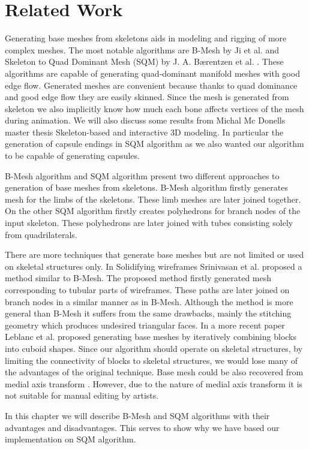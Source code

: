 \chapter{Related Work}
Generating base meshes from skeletons aids in modeling and rigging of more complex meshes. The most notable algorithms are B-Mesh by Ji et al. \cite{ji_bm} and Skeleton to Quad Dominant Mesh (SQM) by J. A. Bærentzen et al. \cite{sqm}. These algorithms are capable of generating quad-dominant manifold meshes with good edge flow. Generated meshes are convenient because thanks to quad dominance and good edge flow they are easily skinned. Since the mesh is generated from skeleton we also implicitly know how much each bone affects vertices of the mesh during animation. We will also discuss some results from Michal Mc Donells master thesis Skeleton-based and interactive 3D modeling\cite{sqm_phd}. In particular the generation of capsule endings in SQM algorithm as we also wanted our algorithm to be capable of generating capsules.

B-Mesh algorithm and SQM algorithm present two different approaches to generation of base meshes from skeletons. B-Mesh algorithm firstly generates mesh for the limbs of the skeletons. These limb meshes are later joined together. On the other SQM algorithm firstly creates polyhedrons for branch nodes of the input skeleton. These polyhedrons are later joined with tubes consisting solely from quadrilaterals.

There are more techniques that generate base meshes but are not limited or used on skeletal structures only.
In Solidifying wireframes Srinivasan et al. \cite{wireframes} proposed a method similar to B-Mesh.
The proposed method firstly generated mesh corresponding to tubular parts of wireframes.
These paths are later joined on branch nodes in a similar manner as in B-Mesh.
Although the method is more general than B-Mesh it suffers from the same drawbacks, mainly the stitching geometry which produces undesired triangular faces.
In a more recent paper Leblanc et al. \cite{blocks} proposed generating base meshes by iteratively combining blocks into cuboid shapes.
Since our algorithm should operate on skeletal structures, by limiting the connectivity of blocks to skeletal structures, we would lose many of the advantages of the original technique.
Base mesh could be also recovered from medial axis transform \cite{mat}.
However, due to the nature of medial axis transform it is not suitable for manual editing by artists.

In this chapter we will describe B-Mesh and SQM algorithms with their advantages and disadvantages. This serves to show why we have based our implementation on SQM algorithm.

